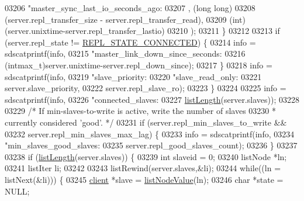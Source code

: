 \begin{DoxyCode}
{{{{{{{{{{{{{{{{{{{{{{{{{{{{{{{{{{{{{{{{{{{{{{{{{{{{{{{{{{{{{{{{{{{{{{{{{{{{{{{{{{{{{{{{{{{{{{{{{{{{{{{{{{{{{{{{{{{{{{{{{{{{{{{{{{{{{{{{{{{{{{{{{{03206                     \textcolor{stringliteral}{"master\_sync\_last\_io\_seconds\_ago:%
03207                     , (\textcolor{keywordtype}{long} \textcolor{keywordtype}{long})
03208                         (server.repl\_transfer\_size - server.repl\_transfer\_read),
03209                     (\textcolor{keywordtype}{int})(server.unixtime-server.repl\_transfer\_lastio)
03210                 );
03211             \}
03212 
03213             \textcolor{keywordflow}{if} (server.repl\_state != \hyperlink{server_8h_aed693b3a9cdfc05cf5ab7551a8c86fbe}{REPL\_STATE\_CONNECTED}) \{
03214                 info = sdscatprintf(info,
03215                     \textcolor{stringliteral}{"master\_link\_down\_since\_seconds:%
03216                     (intmax\_t)server.unixtime-server.repl\_down\_since);
03217             \}
03218             info = sdscatprintf(info,
03219                 \textcolor{stringliteral}{"slave\_priority:%
03220                 \textcolor{stringliteral}{"slave\_read\_only:%
03221                 server.slave\_priority,
03222                 server.repl\_slave\_ro);
03223         \}
03224 
03225         info = sdscatprintf(info,
03226             \textcolor{stringliteral}{"connected\_slaves:%
03227             \hyperlink{adlist_8h_afde0ab079f934670e82119b43120e94b}{listLength}(server.slaves));
03228 
03229         \textcolor{comment}{/* If min-slaves-to-write is active, write the number of slaves}
03230 \textcolor{comment}{         * currently considered 'good'. */}
03231         \textcolor{keywordflow}{if} (server.repl\_min\_slaves\_to\_write &&
03232             server.repl\_min\_slaves\_max\_lag) \{
03233             info = sdscatprintf(info,
03234                 \textcolor{stringliteral}{"min\_slaves\_good\_slaves:%
03235                 server.repl\_good\_slaves\_count);
03236         \}
03237 
03238         \textcolor{keywordflow}{if} (\hyperlink{adlist_8h_afde0ab079f934670e82119b43120e94b}{listLength}(server.slaves)) \{
03239             \textcolor{keywordtype}{int} slaveid = 0;
03240             listNode *ln;
03241             listIter li;
03242 
03243             listRewind(server.slaves,&li);
03244             \textcolor{keywordflow}{while}((ln = listNext(&li))) \{
03245                 \hyperlink{structclient}{client} *slave = \hyperlink{adlist_8h_af84cae230e7180ebcda1e2736fce9f65}{listNodeValue}(ln);
03246                 \textcolor{keywordtype}{char} *state = NULL;
}}}}}}}}}}}}}}}}}}}}}}}}}}}}}}}}}}}}}}}}}}}}}}}}}}}}}}}}}}}}}}}}}}}}}}}}}}}}}}}}}}}}}}}}}}}}}}}}}}}}}}}}}}}}}}}}}}}}}}}}}}}}}}}}}}}}}}}}}}}}}}}}}}}}}}}}
\end{DoxyCode}
